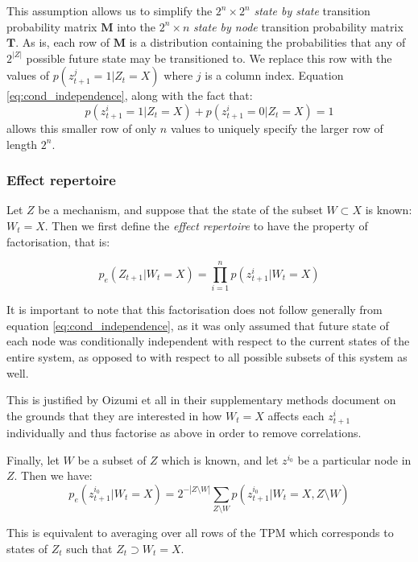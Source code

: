 This assumption allows us to simplify the $2^n \times 2^n $ \textit{state by state} transition probability matrix $\mathbf{M}$ into the $2^n \times n$ \textit{state by node} transition probability matrix $\mathbf{T}$. As is, each row of $\mathbf{M}$ is a distribution containing the probabilities that any of $2^{|Z|}$ possible future state may be transitioned to. We replace this row with the values of $p(z^j_{t+1}=1|Z_t=X)$ where $j$ is a column index. Equation \ref{eq:cond_independence}, along with the fact that: \[p(z^i_{t+1}=1|Z_t=X)+p(z^i_{t+1} =0|Z_t=X) =1\]
allows this smaller row of only $n$ values to uniquely specify the larger row of length $2^n$.


\subsubsection{Effect repertoire}

Let $Z$ be a mechanism, and suppose that the state of the subset $W \subset X$ is known: $W_t = X$. Then we first define the \textit{effect repertoire} to have the property of factorisation, that is:

\begin{equation}
\label{def:controversial}
p_e(Z_{t+1}|W_t = X) = \prod \limits_{i= 1}^n p(z^i_{t+1}|W_t = X)
\end{equation}

It is important to note that this factorisation does not follow generally from equation \ref{eq:cond_independence}, as it was only assumed that future state of each node was conditionally independent with respect to the current states of the entire system, as opposed to with respect to all possible subsets of this system as well.

This is justified by Oizumi et all \cite{oizumi2014phenomenology} in their supplementary methods document on the grounds that they are interested in how $W_t=X$ affects each $z^i_{t+1}$ individually and thus factorise as above in order to remove correlations.


Finally, let $W$ be a subset of $Z$ which is known, and let $z^{i_0}$ be a particular node in $Z$. Then we have:
\begin{equation}
\label{def:effect_repertoire}
p_e(z_{t+1}^{i_0}|W_t = X) = 2^{-|Z\setminus W|}\sum \limits_{Z\setminus W} p(z_{t+1}^{i_0}|W_t = X, Z\setminus W)
\end{equation}

This is equivalent to averaging over all rows of the TPM which corresponds to states of $Z_t$ such that $Z_t \supset W_t = X$.

